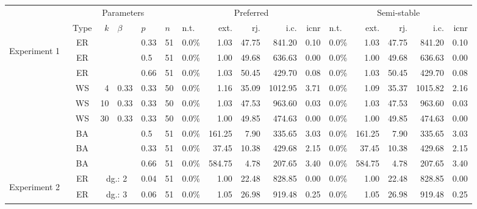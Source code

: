 \documentclass[parskip=half]{scrartcl}
\begin{document}
\begin{sidewaystable}[h!]
\begin{tabular}[h]{|c|c|r|l|l|l|l|r|r|r|r|l|r|r|r|r|} %
\cline{2-16}
\multicolumn{1}{c|}{} & \multicolumn{5}{|c|}{Parameters} & \multicolumn{5}{|c|}{Preferred} & \multicolumn{5}{|c|}{Semi-stable} \\
\cline{2-16}
\multicolumn{1}{c|}{} & Type & $k$ & $\beta$ & $p$ & $n$ & n.t. & ext. & rj. & i.c. & icnr & n.t. & ext. & rj. & i.c. & icnr \\
\hline
\multirow{9}{*}{\begin{sideways} Experiment 1~ \end{sideways}}
& ER & \multicolumn{2}{|c|}{} & 0.33 & 51 & 0.0\% & 1.03 & 47.75 & 841.20 & 0.10 & 0.0\%  & 1.03 & 47.75 & 841.20 & 0.10\\
& ER & \multicolumn{2}{|c|}{} & 0.5 & 51 & 0.0\% & 1.00 & 49.68 & 636.63 & 0.00 & 0.0\%  & 1.00 & 49.68 & 636.63 & 0.00\\
& ER & \multicolumn{2}{|c|}{} & 0.66 & 51 & 0.0\% & 1.03 & 50.45 & 429.70 & 0.08 & 0.0\%  & 1.03 & 50.45 & 429.70 & 0.08\\
\cline{2-16}
& WS & 4 & 0.33 & 0.33 & 50 &  0.0\% & 1.16 & 35.09 & 1012.95 & 3.71 & 0.0\% & 1.09 & 35.37 & 1015.82 & 2.16\\
& WS & 10 & 0.33 & 0.33 & 50 & 0.0\% & 1.03 & 47.53 & 963.60 & 0.03 & 0.0\%  & 1.03 & 47.53 & 963.60 & 0.03\\
& WS & 30 & 0.33 & 0.33 & 50 & 0.0\% & 1.00 & 49.85 & 474.63 & 0.00 & 0.0\%  & 1.00 & 49.85 & 474.63 & 0.00\\
\cline{2-16}
& BA & \multicolumn{2}{|c|}{} & 0.5  & 51 & 0.0\% & 161.25 & 7.90  & 335.65 & 3.03 & 0.0\%  & 161.25 &  7.90 & 335.65 & 3.03\\
& BA & \multicolumn{2}{|c|}{} & 0.33 & 51 & 0.0\% &  37.45 & 10.38 & 429.68 & 2.15 & 0.0\%  &  37.45 & 10.38 & 429.68 & 2.15\\
& BA & \multicolumn{2}{|c|}{} & 0.66 & 51 & 0.0\% & 584.75 & 4.78  & 207.65 & 3.40 & 0.0\%  & 584.75 &  4.78 & 207.65 & 3.40\\
\hline
\hline
\multirow{13}{*}{\begin{sideways} Experiment 2~ \end{sideways}}
& ER & \multicolumn{2}{|c|}{dg.: 2} & 0.04 & 51 & 0.0\% & 1.00 & 22.48 & 828.85 & 0.00 & 0.0\%  & 1.00 & 22.48 & 828.85 & 0.00\\
& ER & \multicolumn{2}{|c|}{dg.: 3} & 0.06 & 51 & 0.0\% & 1.05 & 26.98 & 919.48 & 0.25 & 0.0\%  & 1.05 & 26.98 & 919.48 & 0.25\\

\end{tabular}
\end{sidewaystable}
\end{document}
